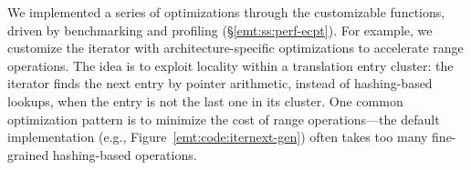  We implemented a series of optimizations through the customizable functions,
	driven by benchmarking and profiling (\S\ref{emt:ss:perf-ecpt}).
For example, we customize the iterator %
	with architecture-specific optimizations
	to accelerate range operations.
The idea is to exploit locality within a translation entry cluster:
	the iterator finds the next entry by pointer arithmetic, instead of hashing-based lookups,
	when the entry is not the last one in its cluster. 
One common optimization pattern is to minimize the cost of range operations---the  
	default implementation (e.g., Figure~\ref{emt:code:iternext-gen}) often takes too many fine-grained hashing-based operations.


